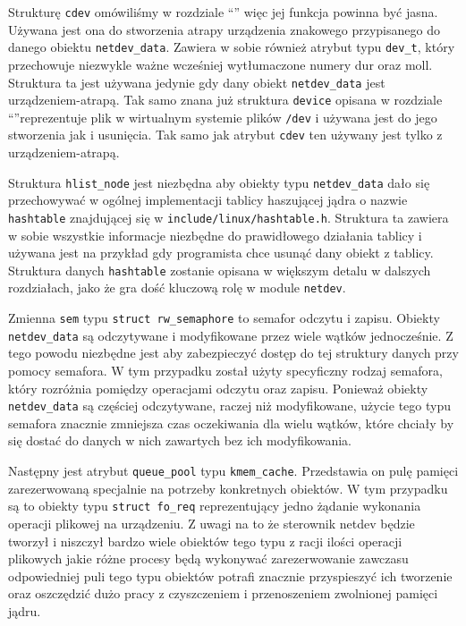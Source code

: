 \documentclass[11pt]{scrartcl}
\begin{document}
Strukturę \texttt{cdev} omówiliśmy w rozdziale ``'' więc jej funkcja powinna być jasna. Używana jest ona do stworzenia atrapy urządzenia znakowego przypisanego do danego obiektu \texttt{netdev\_data}. Zawiera w sobie również atrybut typu \texttt{dev\_t}, który przechowuje niezwykle ważne wcześniej wytłumaczone numery dur oraz moll. Struktura ta jest używana jedynie gdy dany obiekt \texttt{netdev\_data} jest urządzeniem-atrapą. Tak samo znana już struktura \texttt{device} opisana w rozdziale ``''\@ reprezentuje plik w wirtualnym systemie plików \texttt{/dev} i używana jest do jego stworzenia jak i usunięcia. Tak samo jak atrybut \texttt{cdev} ten używany jest tylko z urządzeniem-atrapą.

Struktura \texttt{hlist\_node} jest niezbędna aby obiekty typu \texttt{netdev\_data} dało się przechowywać w ogólnej implementacji tablicy haszującej jądra o nazwie \texttt{hashtable} znajdującej się w \texttt{include/linux/hashtable.h}. Struktura ta zawiera w sobie wszystkie informacje niezbędne do prawidłowego działania tablicy i używana jest na przykład gdy programista chce usunąć dany obiekt z tablicy. Struktura danych \texttt{hashtable} zostanie opisana w większym detalu w dalszych rozdziałach, jako że gra dość kluczową rolę w module \texttt{netdev}.

Zmienna \texttt{sem} typu \texttt{struct rw\_semaphore} to semafor odczytu i zapisu. Obiekty \texttt{netdev\_data} są odczytywane i modyfikowane przez wiele wątków jednocześnie. Z tego powodu niezbędne jest aby zabezpieczyć dostęp do tej struktury danych przy pomocy semafora. W tym przypadku został użyty specyficzny rodzaj semafora, który rozróżnia pomiędzy operacjami odczytu oraz zapisu. Ponieważ obiekty \texttt{netdev\_data} są częściej odczytywane, raczej niż modyfikowane, użycie tego typu semafora znacznie zmniejsza czas oczekiwania dla wielu wątków, które chciały by się dostać do danych w nich zawartych bez ich modyfikowania.

Następny jest atrybut \texttt{queue\_pool} typu \texttt{kmem\_cache}.  Przedstawia on pulę pamięci zarezerwowaną specjalnie na potrzeby konkretnych obiektów. W tym przypadku są to obiekty typu \texttt{struct fo\_req} reprezentujący jedno żądanie wykonania operacji plikowej na urządzeniu. Z uwagi na to że sterownik netdev będzie tworzył i niszczył bardzo wiele obiektów tego typu z racji ilości operacji plikowych jakie różne procesy będą wykonywać zarezerwowanie zawczasu odpowiedniej puli tego typu obiektów potrafi znacznie przyspieszyć ich tworzenie oraz oszczędzić dużo pracy z czyszczeniem i przenoszeniem zwolnionej pamięci jądru.
\end{document}
